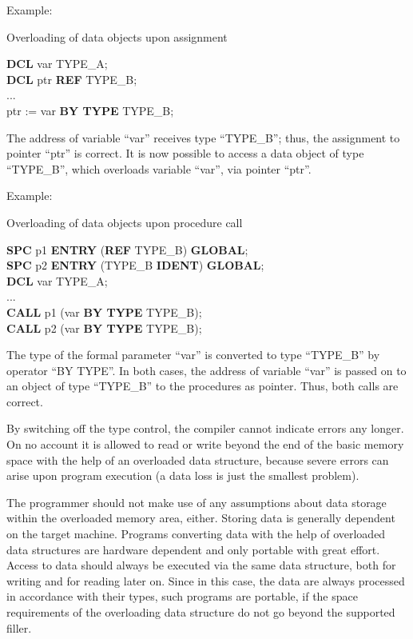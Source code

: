 \begin{removed}
Example:

Overloading of data objects upon assignment

{\bf DCL} var \x        TYPE\_A;\\
{\bf DCL} ptr {\bf REF} TYPE\_B;\\
...\\
ptr := var {\bf BY TYPE} TYPE\_B;

The address of variable ``var'' receives type ``TYPE\_B''; thus, the
assignment to pointer ``ptr'' is correct. It is now possible to access a
data object of type ``TYPE\_B'', which overloads variable ``var'', via
pointer ``ptr''.

Example:

Overloading of data objects upon procedure call

{\bf SPC} p1 {\bf ENTRY} ({\bf REF} TYPE\_B) {\bf GLOBAL};\\
{\bf SPC} p2 {\bf ENTRY} (TYPE\_B {\bf IDENT}) {\bf GLOBAL};\\
{\bf DCL} var TYPE\_A;\\
...\\
{\bf CALL} p1 (var {\bf BY TYPE} TYPE\_B);\\
{\bf CALL} p2 (var {\bf BY TYPE} TYPE\_B);

The type of the formal parameter ``var'' is converted to type
``TYPE\_B'' by operator ``BY TYPE''. In both cases, the address of
variable ``var'' is passed on to an object of type ``TYPE\_B'' to the
procedures as pointer. Thus, both calls are correct.

By switching off the type control, the compiler cannot indicate errors
any longer. On no account it is allowed to read or write beyond the end
of the basic memory space with the help of an overloaded data structure,
because severe errors can arise upon program execution (a data loss is
just the smallest problem).

The programmer should not make use of any assumptions about data storage
within the overloaded memory area, either. Storing data is generally
dependent on the target machine. Programs converting data with the help
of overloaded data structures are hardware dependent and only portable
with great effort. Access to data should always be executed via the same
data structure, both for writing and for reading later on. Since in
this case, the data are always processed in accordance with their types,
such programs are portable, if the space requirements of the overloading
data structure do not go beyond the supported filler.

\end{removed}
